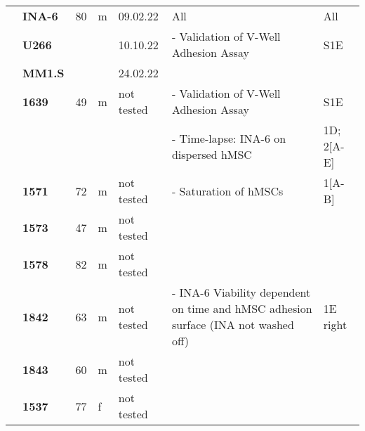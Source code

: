 {\begin{longtable}{%
    |>{\bfseries}p{1.5cm}|
    >{\bfseries}p{1.2cm}|
    p{1.2cm}|
    p{1cm}|
    p{2.3cm}|
    >{\tiny}p{4cm}|
    p{1.7cm}|
    }
    \multirow{3}{1.5cm}{Myeloma Cell Line}
     & INA-6 & 80 & m & 09.02.22   & All                                                                                                      & All                                     \\
    \hhline{~------}
     & U266  &    &   & 10.10.22   & - Validation of V-Well Adhesion Assay                                                                    & S1E                                     \\
    \hhline{~----~~}
     & MM1.S &    &   & 24.02.22   &                                                                                                          &                                         \\
    \hline
    \multirow{3}{1.5cm}{hMSC}
     & 1639  & 49 & m & not tested & - Validation of V-Well Adhesion Assay                                                                    & S1E                                     \\
    \hhline{~~~~~--}
     &       &    &   &            & - Time-lapse: INA-6 on dispersed hMSC                                                                    & 1D; 2[A-E]                              \\
    \hhline{~------}
     & 1571  & 72 & m & not tested & - Saturation of hMSCs                                                                                    & 1[A-B]                                  \\
    \hhline{~----~~}
     & 1573  & 47 & m & not tested &                                                                                                          &                                         \\
    \hhline{~----~~}
     & 1578  & 82 & m & not tested &                                                                                                          &                                         \\
    \hhline{~------}
     & 1842  & 63 & m & not tested & - INA-6 Viability dependent on time and hMSC adhesion surface (INA not washed off)                       & 1E right                                \\
    \hhline{~----~~}
     & 1843  & 60 & m & not tested &                                                                                                          &                                         \\
    \hhline{~----~~}
     & 1537  & 77 & f & not tested &                                                                                                          &                                         \\

\end{longtable}}
